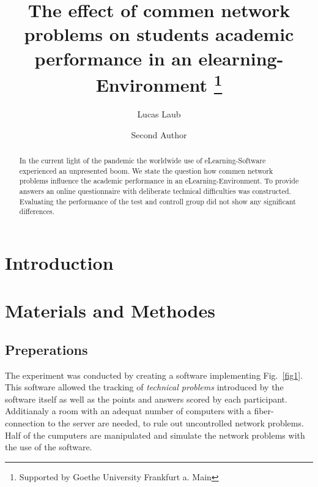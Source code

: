 \documentclass[runningheads]{llncs}
\begin{document}
\title{The effect of commen network problems on students academic performance in an elearning-Environment \thanks{Supported by Goethe University Frankfurt a. Main}}

\author{Lucas Laub \and
Second Author}


\maketitle

\begin{abstract}
In the current light of the pandemic the worldwide use
of eLearning-Software experienced an unpresented boom.
We state the question how commen network problems influence
the academic performance in an eLearning-Environment.
To provide answers an online questionnaire with deliberate
technical difficulties was constructed. Evaluating the performance
of the test and controll group did not show any significant
differences.
\end{abstract}


\section{Introduction}
\section{Materials and Methodes}
\subsection{Preperations}
The experiment was conducted by creating a software implementing Fig.~\ref{fig1}.
This software allowed the tracking of {\itshape technical problems} introduced by
the software itself as well as the points and answers scored by each participant.
Additianaly a room with an adequat number of computers with a fiber-connection
to the server are needed, to rule out uncontrolled network problems.
Half of the cumputers are manipulated and simulate the network problems with the
use of the software.
\end{document}

